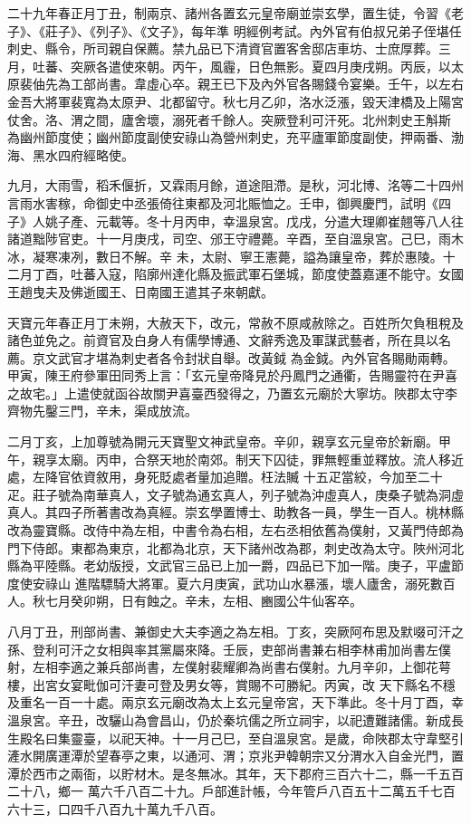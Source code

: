 \begin{pinyinscope}
 二十九年春正月丁丑，制兩京、諸州各置玄元皇帝廟並崇玄學，置生徒，令習《老子》、《莊子》、《列子》、《文子》，每年準
 明經例考試。內外官有伯叔兄弟子侄堪任刺史、縣令，所司親自保薦。禁九品已下清資官置客舍邸店車坊、士庶厚葬。三月，吐蕃、突厥各遣使來朝。丙午，風霾，日色無影。夏四月庚戌朔。丙辰，以太原裴伷先為工部尚書。韋虛心卒。親王已下及內外官各賜錢令宴樂。壬午，以左右金吾大將軍裴寬為太原尹、北都留守。秋七月乙卯，洛水泛漲，毀天津橋及上陽宮仗舍。洛、渭之間，廬舍壞，溺死者千餘人。突厥登利可汗死。北州刺史王斛斯
 為幽州節度使；幽州節度副使安祿山為營州刺史，充平廬軍節度副使，押兩番、渤海、黑水四府經略使。



 九月，大雨雪，稻禾偃折，又霖雨月餘，道途阻滯。是秋，河北博、洺等二十四州言雨水害稼，命御史中丞張倚往東都及河北賑恤之。壬申，御興慶門，試明《四子》人姚子產、元載等。冬十月丙申，幸溫泉宮。戊戌，分遣大理卿崔翹等八人往諸道黜陟官吏。十一月庚戌，司空、邠王守禮薨。辛酉，至自溫泉宮。己巳，雨木冰，凝寒凍冽，數日不解。辛
 未，太尉、寧王憲薨，謚為讓皇帝，葬於惠陵。十二月丁酉，吐蕃入寇，陷廓州達化縣及振武軍石堡城，節度使蓋嘉運不能守。女國王趙曳夫及佛逝國王、日南國王遣其子來朝獻。



 天寶元年春正月丁未朔，大赦天下，改元，常赦不原咸赦除之。百姓所欠負租稅及諸色並免之。前資官及白身人有儒學博通、文辭秀逸及軍謀武藝者，所在具以名薦。京文武官才堪為刺史者各令封狀自舉。改黃鉞
 為金鉞。內外官各賜勛兩轉。甲寅，陳王府參軍田同秀上言：「玄元皇帝降見於丹鳳門之通衢，告賜靈符在尹喜之故宅。」上遣使就函谷故關尹喜臺西發得之，乃置玄元廟於大寧坊。陜郡太守李齊物先鑿三門，辛未，渠成放流。



 二月丁亥，上加尊號為開元天寶聖文神武皇帝。辛卯，親享玄元皇帝於新廟。甲午，親享太廟。丙申，合祭天地於南郊。制天下囚徒，罪無輕重並釋放。流人移近處，左降官依資敘用，身死貶處者量加追贈。枉法贓
 十五疋當絞，今加至二十疋。莊子號為南華真人，文子號為通玄真人，列子號為沖虛真人，庚桑子號為洞虛真人。其四子所著書改為真經。崇玄學置博士、助教各一員，學生一百人。桃林縣改為靈寶縣。改侍中為左相，中書令為右相，左右丞相依舊為僕射，又黃門侍郎為門下侍郎。東都為東京，北都為北京，天下諸州改為郡，刺史改為太守。陜州河北縣為平陸縣。老幼版授，文武官三品已上加一爵，四品已下加一階。庚子，平盧節度使安祿山
 進階驃騎大將軍。夏六月庚寅，武功山水暴漲，壞人廬舍，溺死數百人。秋七月癸卯朔，日有蝕之。辛未，左相、豳國公牛仙客卒。



 八月丁丑，刑部尚書、兼御史大夫李適之為左相。丁亥，突厥阿布思及默啜可汗之孫、登利可汗之女相與率其黨屬來降。壬辰，吏部尚書兼右相李林甫加尚書左僕射，左相李適之兼兵部尚書，左僕射裴耀卿為尚書右僕射。九月辛卯，上御花萼樓，出宮女宴毗伽可汗妻可登及男女等，賞賜不可勝紀。丙寅，改
 天下縣名不穩及重名一百一十處。兩京玄元廟改為太上玄元皇帝宮，天下準此。冬十月丁酉，幸溫泉宮。辛丑，改驪山為會昌山，仍於秦坑儒之所立祠宇，以祀遭難諸儒。新成長生殿名曰集靈臺，以祀天神。十一月己巳，至自溫泉宮。是歲，命陜郡太守韋堅引滻水開廣運潭於望春亭之東，以通河、渭；京兆尹韓朝宗又分渭水入自金光門，置潭於西市之兩衙，以貯材木。是冬無冰。其年，天下郡府三百六十二，縣一千五百二十八，鄉一
 萬六千八百二十九。戶部進計帳，今年管戶八百五十二萬五千七百六十三，口四千八百九十萬九千八百。




\end{pinyinscope}
